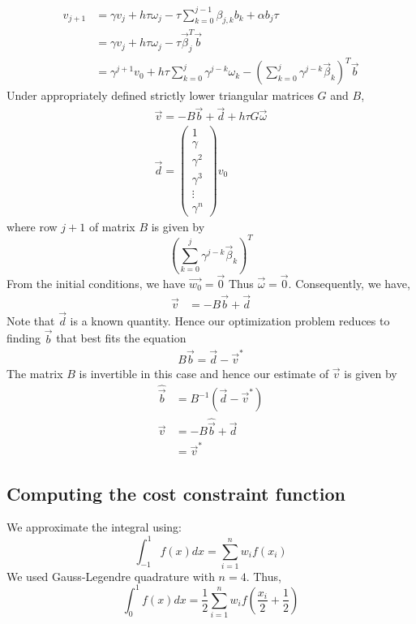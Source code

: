 \documentclass{ifacconf}
\begin{document}
\begin{align} \label{eq:p0evolution}
v_{j+1} &= \gamma v_j + h\tau\omega_j - \tau\sum_{k=0}^{j-1}\beta_{j,k}b_k
	   + \alpha b_j\tau \\
	   &= \gamma v_j + h\tau\omega_j - \tau \vec{\beta}_j^T \vec{b}\\
	   &= \gamma^{j+1}v_0 
	   + h\tau\sum_{k=0}^{j} \gamma^{j-k}\omega_k
	   - \left(\sum_{k=0}^{j} \gamma^{j-k} \vec{\beta}_k\right)^T \vec{b}
\end{align}
Under appropriately defined strictly lower triangular matrices $G$ and $B$,
\begin{align}
	\vec{v} = - B\vec{b}+\vec{d} + h\tau G\vec{\omega}  \\
	\vec{d}=\begin{pmatrix} 1 \\ \gamma \\  \gamma^2 \\ \gamma^3 \\ \vdots \\ \gamma^{n} \end{pmatrix}v_0
\end{align}
where row $j+1$ of matrix $B$ is given by
\[
\left(\sum_{k=0}^{j} \gamma^{j-k} \vec{\beta}_k\right)^T
\]
From the initial conditions, we have $\vec{w_0} = \vec{0}$ Thus $\vec{\omega} =
\vec{0}$. Consequently, we have,
\begin{align}
	\vec{v} &= -B\vec{b} + \vec{d}
\end{align}
Note that $\vec{d}$ is a known quantity.
Hence our optimization problem reduces to finding $\vec{b}$ that best fits the equation
\begin{align}
	B\vec{b} = \vec{d}-\vec{v}^*
\end{align}
The matrix $B$ is invertible in this case and hence our estimate of $\vec{v}$ is given by 
\begin{align}
	\hat{\vec{b}} &= B^{-1} \left( \vec{d} - \vec{v}^* \right)\\
	\vec{v} &= -B\hat{\vec{b}} + \vec{d} \\
	        &= \vec{v}^*
\end{align}

\subsection{Computing the cost constraint function}
We approximate the integral using:
\begin{equation}
\int_{-1}^{1}f(x)dx = \sum_{i=1}^{n} w_if(x_i)
\end{equation}
We used Gauss-Legendre quadrature with $n=4$.
Thus,
\begin{equation}
	\int_{0}^{1}f(x)dx = \frac{1}{2}\sum_{i=1}^{n} w_if\left(\frac{x_i}{2} +
	\frac{1}{2}\right)
\end{equation}
\end{document}
